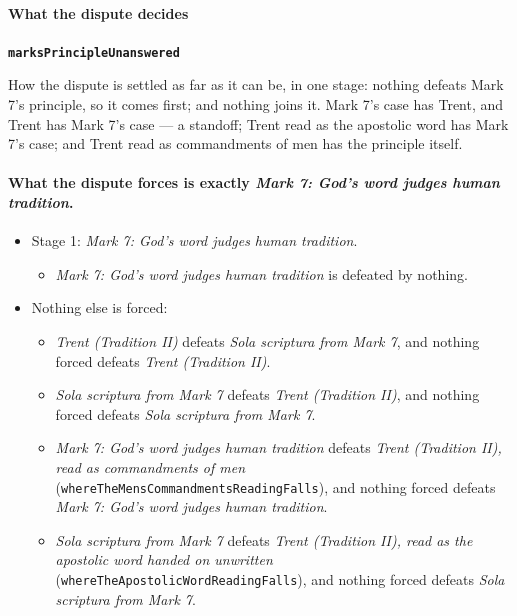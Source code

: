 \documentclass[11pt]{article}
\begin{document}
\paragraph*{What the dispute decides}
\leavevmode\par
\par\medskip\noindent\textbf{\texttt{marks\allowbreak{}Principle\allowbreak{}Unanswered}}\par\nobreak\noindent
How the dispute is settled as far as it can be, in one stage: nothing defeats Mark 7's principle, so it comes first; and nothing joins it. Mark 7's case has Trent, and Trent has Mark 7's case — a standoff; Trent read as the apostolic word has Mark 7's case; and Trent read as commandments of men has the principle itself.

\paragraph{What the dispute forces is exactly \emph{Mark 7: God's word judges human tradition}.}
\begin{itemize}
\item Stage 1: \emph{Mark 7: God's word judges human tradition}.
\begin{itemize}
\item \emph{Mark 7: God's word judges human tradition} is defeated by nothing.
\end{itemize}
\item Nothing else is forced:
\begin{itemize}
\item \emph{Trent (Tradition II)} defeats \emph{Sola scriptura from Mark 7}, and nothing forced defeats \emph{Trent (Tradition II)}.
\item \emph{Sola scriptura from Mark 7} defeats \emph{Trent (Tradition II)}, and nothing forced defeats \emph{Sola scriptura from Mark 7}.
\item \emph{Mark 7: God's word judges human tradition} defeats \emph{Trent (Tradition II), read as commandments of men} (\texttt{where\allowbreak{}The\allowbreak{}Mens\allowbreak{}Commandments\allowbreak{}Reading\allowbreak{}Falls}), and nothing forced defeats \emph{Mark 7: God's word judges human tradition}.
\item \emph{Sola scriptura from Mark 7} defeats \emph{Trent (Tradition II), read as the apostolic word handed on unwritten} (\texttt{where\allowbreak{}The\allowbreak{}Apostolic\allowbreak{}Word\allowbreak{}Reading\allowbreak{}Falls}), and nothing forced defeats \emph{Sola scriptura from Mark 7}.
\end{itemize}
\end{itemize}
\end{document}
